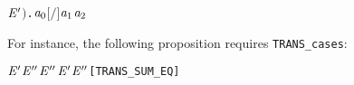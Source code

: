 \begin{itemize}
\begin{alltt}
             \HOLTokenTransBegin{}\HOLTokenTransEnd \ensuremath{\HOLBoundVar{E}\sp{\prime}}\ensuremath{)} \HOLSymConst{\HOLTokenDisj{}} \HOLSymConst{\HOLTokenExists{}} . \ensuremath{\HOLBoundVar{a}\sb{\mathrm{0}}} \HOLSymConst{\ensuremath{=}}    \HOLSymConst{\HOLTokenConj{}} \ensuremath{[}  \ensuremath{/}\ensuremath{]}  \HOLTokenTransBegin\ensuremath{\HOLBoundVar{a}\sb{\mathrm{1}}}\HOLTokenTransEnd \ensuremath{\HOLBoundVar{a}\sb{\mathrm{2}}}    
\end{alltt}  
For instance, the following proposition requires \texttt{TRANS_cases}:
\begin{alltt}
\HOLTokenTurnstile{}  \HOLSymConst{\ensuremath{+}} \ensuremath{\HOLFreeVar{E}\sp{\prime}} \HOLTokenTransBegin{}\HOLTokenTransEnd \ensuremath{\HOLFreeVar{E}\sp{\prime\prime}} \HOLSymConst{\HOLTokenEquiv{}}  \HOLTokenTransBegin{}\HOLTokenTransEnd \ensuremath{\HOLFreeVar{E}\sp{\prime\prime}} \HOLSymConst{\HOLTokenDisj{}} \ensuremath{\HOLFreeVar{E}\sp{\prime}} \HOLTokenTransBegin{}\HOLTokenTransEnd \ensuremath{\HOLFreeVar{E}\sp{\prime\prime}}\hfill{[TRANS_SUM_EQ]}
\end{alltt}
\end{itemize}

